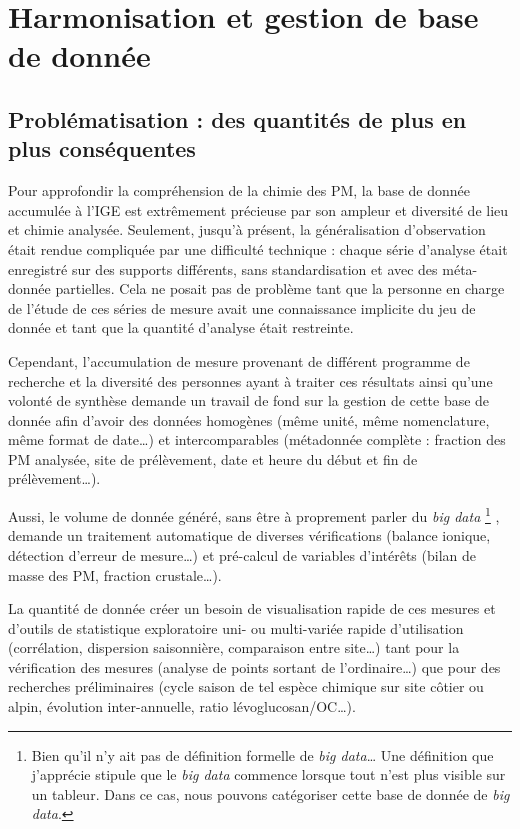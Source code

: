 \section{Harmonisation et gestion de base de donnée}%
\label{sec:harmonisation_et_gestion_de_base_de_donnée}

\subsection{Problématisation : des quantités de plus en plus conséquentes}%
\label{sub:problématisation_des_quantités_de_plus_en_plus_conséquentes}

Pour approfondir la compréhension de la chimie des PM, la base de donnée accumulée à l'IGE
est extrêmement précieuse par son ampleur et diversité de lieu et chimie analysée.
Seulement, jusqu'à présent, la généralisation d'observation était rendue compliquée par une
difficulté technique : chaque série d'analyse était enregistré sur des supports différents,
sans standardisation et avec des méta-donnée partielles. Cela ne posait pas de problème
tant que la personne en charge de l'étude de ces séries de mesure avait une connaissance
implicite du jeu de donnée et tant que la quantité d'analyse était restreinte.

Cependant, l'accumulation de mesure provenant de différent programme de recherche et la
diversité des personnes ayant à traiter ces résultats ainsi qu'une volonté de synthèse
demande un travail de fond sur la gestion de cette base de donnée afin d'avoir des données
homogènes (même unité, même nomenclature, même format de date…) et intercomparables
(métadonnée complète : fraction des PM analysée, site de prélèvement, date et heure du
début et fin de prélèvement…).

Aussi, le volume de donnée généré, sans être à proprement parler du \textit{big data}
\footnote{Bien qu'il n'y ait pas de définition formelle de \textit{big data}…  Une
    définition que j'apprécie stipule que le \textit{big data} commence lorsque tout
    n'est plus visible sur un tableur. Dans ce cas, nous pouvons catégoriser cette base de
donnée de \textit{big data}.}
, demande un traitement automatique de diverses vérifications (balance ionique, détection
d'erreur de mesure…) et pré-calcul de variables d'intérêts (bilan de masse des PM,
fraction crustale…).

La quantité de donnée créer un besoin de visualisation rapide de ces mesures et
d'outils de statistique exploratoire uni- ou multi-variée rapide d'utilisation
(corrélation, dispersion saisonnière, comparaison entre site…) tant pour la vérification
des mesures (analyse de points sortant de l'ordinaire…) que pour des recherches
préliminaires (cycle saison de tel espèce chimique sur site côtier ou alpin, évolution
inter-annuelle, ratio lévoglucosan/OC…).

